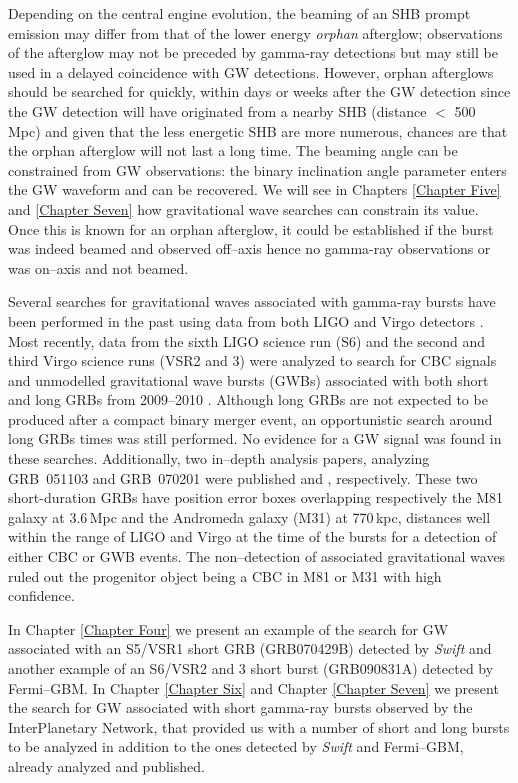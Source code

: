 Depending on the central engine evolution, the beaming of an SHB prompt emission may differ from that of the lower energy \emph{orphan} afterglow; observations of the afterglow may not be preceded by gamma-ray detections \cite{Nakar:2002un} but may still be used in a delayed coincidence with GW detections. However, orphan afterglows should be searched for quickly, within days or weeks after the GW detection since the GW detection will have originated from a nearby SHB (distance $<$ 500 Mpc) and given that the less energetic SHB are more numerous, chances are that the orphan afterglow will not last a long time. The beaming angle can be constrained from GW observations: the binary inclination angle parameter enters the GW waveform and can be recovered. We will see in Chapters \ref{Chapter Five} and \ref{Chapter Seven} how gravitational wave searches can constrain its value. Once this is known for an orphan afterglow, it could be established if the burst was indeed beamed and observed off--axis hence no gamma-ray observations or was on--axis and not beamed.

Several searches for gravitational waves associated with gamma-ray bursts have been performed in the past using data from both LIGO and Virgo detectors \cite{abbottgrb05,burstGrbS234,Ac_etal:07,Ac_etal:08}. Most recently, data from the sixth LIGO science run (S6) and the second and third Virgo science runs (VSR2 and 3) were analyzed to search for \ac{CBC} signals and unmodelled gravitational wave bursts (GWBs) associated with both short and long GRBs from 2009--2010 \cite{lvc:s6grb}. Although long GRBs are not expected to be produced after a compact binary merger event, an opportunistic search around long GRBs times was still performed. No evidence for a \ac{GW} signal was found in these searches. Additionally, two in--depth analysis papers, analyzing GRB~051103 and GRB~070201 were published \cite{Abadie:2012bz} and \cite{Abbott:2007rh}, respectively. These two short-duration GRBs have position error boxes overlapping respectively the M81 galaxy at 3.6\,Mpc and the Andromeda galaxy (M31) at 770\,kpc, distances well within the range of LIGO and Virgo at the time of the bursts for a detection of either \ac{CBC} or GWB events. The non--detection of associated gravitational waves ruled out the progenitor object being a CBC in M81 or M31 with high confidence.

In Chapter \ref{Chapter Four} we present an example of the search for GW associated with an S5/VSR1 short GRB (GRB070429B) detected by \emph{Swift} and another example of an S6/VSR2 and 3 short burst (GRB090831A) detected by Fermi--GBM. In Chapter \ref{Chapter Six} and Chapter \ref{Chapter Seven} we present the search for GW associated with short gamma-ray bursts observed by the InterPlanetary Network, that provided us with a number of short and long bursts to be analyzed in addition to the ones detected by \emph{Swift} and Fermi--GBM, already analyzed and published.

